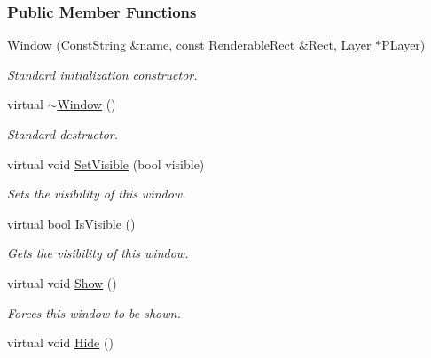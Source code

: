 \subsubsection*{Public Member Functions}
\begin{DoxyCompactItemize}
\item 
\hyperlink{classphys_1_1UI_1_1Window_a2a85e34ec05ddf8e2713c02b5d6e7c90}{Window} (\hyperlink{namespacephys_a5ce5049f8b4bf88d6413c47b504ebb31}{ConstString} \&name, const \hyperlink{structphys_1_1UI_1_1RenderableRect}{RenderableRect} \&Rect, \hyperlink{classphys_1_1UI_1_1Layer}{Layer} $\ast$PLayer)
\begin{DoxyCompactList}\small\item\em Standard initialization constructor. \item\end{DoxyCompactList}\item 
\hypertarget{classphys_1_1UI_1_1Window_a3480249de9950a3993c5e7f836aa8f59}{
virtual \hyperlink{classphys_1_1UI_1_1Window_a3480249de9950a3993c5e7f836aa8f59}{$\sim$Window} ()}
\label{classphys_1_1UI_1_1Window_a3480249de9950a3993c5e7f836aa8f59}

\begin{DoxyCompactList}\small\item\em Standard destructor. \item\end{DoxyCompactList}\item 
virtual void \hyperlink{classphys_1_1UI_1_1Window_a351439e78013bc87ecadcc00bce08573}{SetVisible} (bool visible)
\begin{DoxyCompactList}\small\item\em Sets the visibility of this window. \item\end{DoxyCompactList}\item 
virtual bool \hyperlink{classphys_1_1UI_1_1Window_aa1d88c50c0965510b494b51f3e5a7bf0}{IsVisible} ()
\begin{DoxyCompactList}\small\item\em Gets the visibility of this window. \item\end{DoxyCompactList}\item 
\hypertarget{classphys_1_1UI_1_1Window_af945bd84876d577d1dc6e1c7e28329a8}{
virtual void \hyperlink{classphys_1_1UI_1_1Window_af945bd84876d577d1dc6e1c7e28329a8}{Show} ()}
\label{classphys_1_1UI_1_1Window_af945bd84876d577d1dc6e1c7e28329a8}

\begin{DoxyCompactList}\small\item\em Forces this window to be shown. \item\end{DoxyCompactList}\item 
\hypertarget{classphys_1_1UI_1_1Window_a5eb51c6e1b2c440b52196fcf1022285e}{
virtual void \hyperlink{classphys_1_1UI_1_1Window_a5eb51c6e1b2c440b52196fcf1022285e}{Hide} ()}
\label{classphys_1_1UI_1_1Window_a5eb51c6e1b2c440b52196fcf1022285e}


\end{DoxyCompactItemize}
